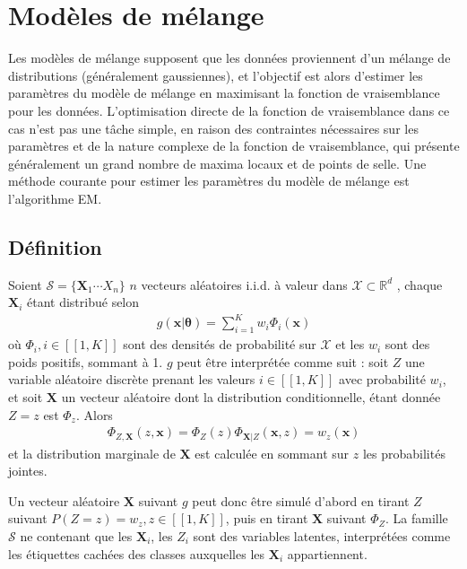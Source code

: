 \documentclass[letterpaper,10pt,french]{sphinxmanual}
\begin{document}
\section{Modèles de mélange}
\label{\detokenize{clustering:modeles-de-melange}}
\sphinxAtStartPar
Les modèles de mélange supposent que les données proviennent d’un mélange de distributions (généralement gaussiennes), et l’objectif est alors d’estimer les paramètres du modèle de mélange en maximisant la fonction de vraisemblance pour les données.
L’optimisation directe de la fonction de vraisemblance dans ce cas n’est pas une tâche simple, en raison des contraintes nécessaires sur les paramètres et de la nature complexe de la fonction de vraisemblance, qui présente généralement un grand nombre de maxima locaux et de points de selle. Une méthode courante pour estimer les paramètres du modèle de mélange est l’algorithme EM.


\subsection{Définition}
\label{\detokenize{clustering:definition}}
\sphinxAtStartPar
Soient \(\mathcal S = \{\mathbf X_1\cdots X_n\}\) \(n\) vecteurs aléatoires i.i.d. à valeur dans \(\mathcal X\subset \mathbb{R}^d\) , chaque \(\mathbf X_i\) étant distribué selon
\begin{equation*}
\begin{split}g(\mathbf x|\boldsymbol \theta) = \displaystyle\sum_{i=1}^K w_i\Phi_i(\mathbf x)\end{split}
\end{equation*}
\sphinxAtStartPar
où \(\Phi_i,i\in[\![1,K]\!]\) sont des densités de probabilité sur \(\mathcal X\) et les \(w_i\) sont des poids positifs, sommant à 1. \(g\) peut être interprétée comme suit : soit \(Z\) une variable aléatoire discrète prenant les valeurs \(i\in[\![1,K]\!]\) avec probabilité \(w_i\), et soit \(\mathbf X\) un vecteur aléatoire dont la distribution conditionnelle, étant donnée \(Z=z\) est \(\Phi_z\). Alors
\begin{equation*}
\begin{split}\Phi_{Z,\mathbf X}(z,\mathbf x) = \Phi_Z(z)\Phi_{\mathbf X|Z}(\mathbf x,z) = w_z(\mathbf x)\end{split}
\end{equation*}
\sphinxAtStartPar
et la distribution marginale de \(\mathbf X\) est calculée en sommant sur \(z\) les probabilités jointes.

\sphinxAtStartPar
Un vecteur aléatoire \(\mathbf X\) suivant \(g\) peut donc être simulé d’abord en tirant \(Z\) suivant \(P(Z=z)=w_z,z\in[\![1,K]\!]\), puis en tirant \(\mathbf X\) suivant \(\Phi_Z\). La famille \(\mathcal S\) ne contenant que les \(\mathbf X_i\), les \(Z_i\) sont des variables latentes, interprétées comme les étiquettes cachées des classes auxquelles les \(\mathbf X_i\) appartiennent.
\end{document}
